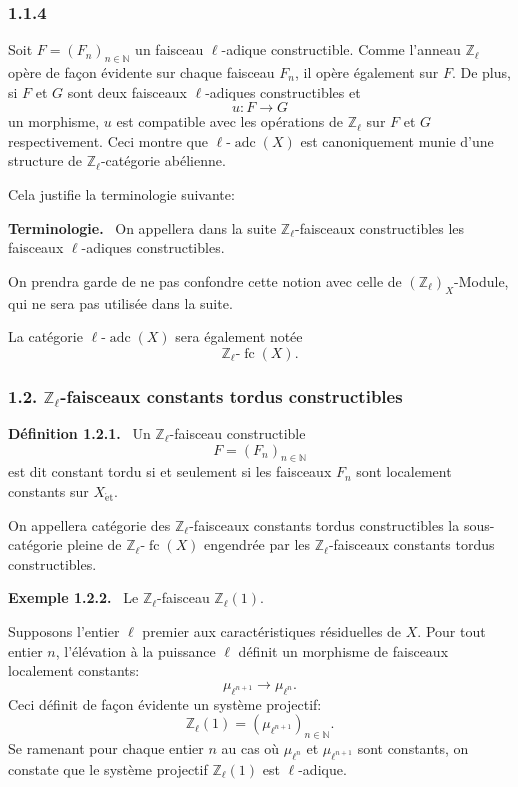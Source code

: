 \documentclass[11pt]{article}
\newenvironment{statement}[1]{\par\medskip\noindent\textbf{#1.}\ }{\par\medskip}
\providecommand{\fc}{\operatorname{fc}}
\providecommand{\adc}{\operatorname{adc}}
\begin{document}
\subsubsection*{1.1.4}
Soit \(F=(F_n)_{n\in\mathbb N}\) un faisceau \(\ell\)-adique constructible. Comme l'anneau \(\mathbb Z_\ell\) opère de façon évidente sur chaque faisceau \(F_n\), il opère également sur \(F\). De plus, si \(F\) et \(G\) sont deux faisceaux \(\ell\)-adiques constructibles et
\[
u:F\longrightarrow G
\]
un morphisme, \(u\) est compatible avec les opérations de \(\mathbb Z_\ell\) sur \(F\) et \(G\) respectivement. Ceci montre que \(\ell\text{-}\adc(X)\) est canoniquement munie d'une structure de \(\mathbb Z_\ell\)-catégorie abélienne.

Cela justifie la terminologie suivante:

\begin{statement}{Terminologie}
On appellera dans la suite \(\mathbb Z_\ell\)-faisceaux constructibles les faisceaux \(\ell\)-adiques constructibles.
\end{statement}

On prendra garde de ne pas confondre cette notion avec celle de \((\mathbb Z_\ell)_X\)-Module, qui ne sera pas utilisée dans la suite.

La catégorie \(\ell\text{-}\adc(X)\) sera également notée
\[
\mathbb Z_\ell\text{-}\fc(X).
\]

\subsubsection*{1.2. \(\mathbb Z_\ell\)-faisceaux constants tordus constructibles}

\begin{statement}{Définition 1.2.1}
Un \(\mathbb Z_\ell\)-faisceau constructible
\[
F=(F_n)_{n\in\mathbb N}
\]
est dit constant tordu si et seulement si les faisceaux \(F_n\) sont localement constants sur \(X_{\mathrm{\acute et}}\).
\end{statement}

On appellera catégorie des \(\mathbb Z_\ell\)-faisceaux constants tordus constructibles la sous-catégorie pleine de \(\mathbb Z_\ell\text{-}\fc(X)\) engendrée par les \(\mathbb Z_\ell\)-faisceaux constants tordus constructibles.

\begin{statement}{Exemple 1.2.2}
Le \(\mathbb Z_\ell\)-faisceau \(\mathbb Z_\ell(1)\).
\end{statement}

Supposons l'entier \(\ell\) premier aux caractéristiques résiduelles de \(X\). Pour tout entier \(n\), l'élévation à la puissance \(\ell\) définit un morphisme de faisceaux localement constants:
\[
\mu_{\ell^{n+1}}\longrightarrow \mu_{\ell^n}.
\]
Ceci définit de façon évidente un système projectif:
\[
\mathbb Z_\ell(1)=(\mu_{\ell^{n+1}})_{n\in\mathbb N}.
\]
Se ramenant pour chaque entier \(n\) au cas où \(\mu_{\ell^n}\) et \(\mu_{\ell^{n+1}}\) sont constants, on constate que le système projectif \(\mathbb Z_\ell(1)\) est \(\ell\)-adique.
\end{document}
